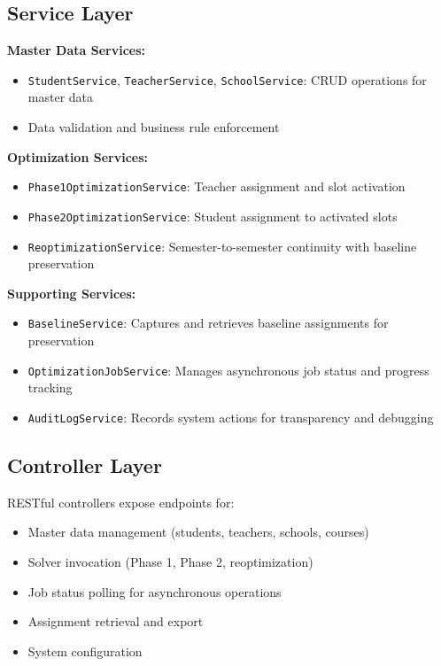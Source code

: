 \documentclass[12pt,a4paper]{report}
\begin{document}
\subsection{Service Layer}

\textbf{Master Data Services:}
\begin{itemize}
    \item \texttt{StudentService}, \texttt{TeacherService}, \texttt{SchoolService}: CRUD operations for master data
    \item Data validation and business rule enforcement
\end{itemize}

\textbf{Optimization Services:}
\begin{itemize}
    \item \texttt{Phase1OptimizationService}: Teacher assignment and slot activation
    \item \texttt{Phase2OptimizationService}: Student assignment to activated slots
    \item \texttt{ReoptimizationService}: Semester-to-semester continuity with baseline preservation
\end{itemize}

\textbf{Supporting Services:}
\begin{itemize}
    \item \texttt{BaselineService}: Captures and retrieves baseline assignments for preservation
    \item \texttt{OptimizationJobService}: Manages asynchronous job status and progress tracking
    \item \texttt{AuditLogService}: Records system actions for transparency and debugging
\end{itemize}

\subsection{Controller Layer}

RESTful controllers expose endpoints for:
\begin{itemize}
    \item Master data management (students, teachers, schools, courses)
    \item Solver invocation (Phase 1, Phase 2, reoptimization)
    \item Job status polling for asynchronous operations
    \item Assignment retrieval and export
    \item System configuration
\end{itemize}
\end{document}
